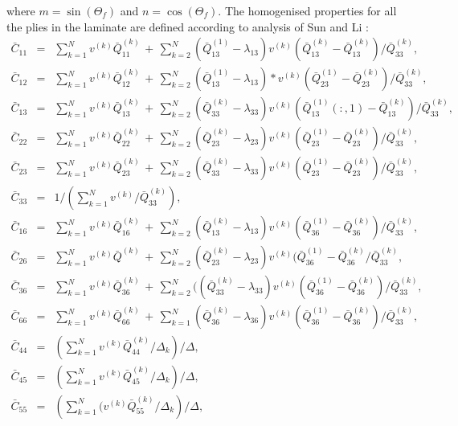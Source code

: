 where \(m=\sin(\Theta_f)\) and \(n=\cos(\Theta_f)\).
The homogenised properties for all the plies in the laminate are defined according to analysis of Sun and Li \cite{sun1988three}:
\begin{eqnarray}
	\bar{C}_{11} &=& \sum_{k=1}^Nv^{(k)}\bar{Q}^{(k)}_{11}\,+\,\sum_{k=2}^N(\bar{Q}^{(1)}_{13}-\lambda_{13})v^{(k)}(\bar{Q}^{(k)}_{13}-\bar{Q}^{(k)}_{13})/\bar{Q}^{(k)}_{33},\nonumber\\
	\bar{C}_{12} &=& \sum_{k=1}^Nv^{(k)}\bar{Q}^{(k)}_{12}\,+\,\sum_{k=2}^N(\bar{Q}^{(1)}_{13}-\lambda_{13})*v^{(k)}(\bar{Q}^{(1)}_{23}-\bar{Q}^{(k)}_{23})/\bar{Q}^{(k)}_{33},\nonumber\\
	\bar{C}_{13} &=& \sum_{k=1}^Nv^{(k)}\bar{Q}^{(k)}_{13}\,+\,\sum_{k=2}^N(\bar{Q}^{(k)}_{33}-\lambda_{33})v^{(k)}(\bar{Q}^{(1)}_{13}(:,1)-\bar{Q}^{(k)}_{13})/\bar{Q}^{(k)}_{33},\nonumber\\
	\bar{C}_{22} &=& \sum_{k=1}^Nv^{(k)}\bar{Q}^{(k)}_{22}\,+\,\sum_{k=2}^N(\bar{Q}^{(k)}_{23}-\lambda_{23})v^{(k)}(\bar{Q}^{(1)}_{23}-\bar{Q}^{(k)}_{23})/\bar{Q}^{(k)}_{33},\nonumber\\
	\bar{C}_{23} &=& \sum_{k=1}^Nv^{(k)}\bar{Q}^{(k)}_{23}\,+\,\sum_{k=2}^N(\bar{Q}^{(k)}_{33}-\lambda_{33})v^{(k)}(\bar{Q}^{(1)}_{23}-\bar{Q}^{(k)}_{23})/\bar{Q}^{(k)}_{33},\nonumber\\
	\bar{C}_{33} &=& 1/\left(\sum_{k=1}^Nv^{(k)}/\bar{Q}^{(k)}_{33}\right),\nonumber\\
	\bar{C}_{16} &=& \sum_{k=1}^Nv^{(k)}\bar{Q}^{(k)}_{16}\,+\,\sum_{k=2}^N(\bar{Q}^{(k)}_{13}-\lambda_{13})v^{(k)}(\bar{Q}^{(1)}_{36}-\bar{Q}^{(k)}_{36})/\bar{Q}^{(k)}_{33},\nonumber\\
	\bar{C}_{26} &=& \sum_{k=1}^Nv^{(k)}\bar{Q}^{(k)}\,+\,\sum_{k=2}^N(\bar{Q}^{(k)}_{23}-\lambda_{23})v^{(k)}(\bar{Q}^{(1)}_{36}-\bar{Q}^{(k)}_{36}/\bar{Q}^{(k)}_{33},\nonumber\\
	\bar{C}_{36} &=& \sum_{k=1}^Nv^{(k)}\bar{Q}^{(k)}_{36}\,+\,\sum_{k=2}^N((\bar{Q}^{(k)}_{33}-\lambda_{33})v^{(k)}(\bar{Q}^{(1)}_{36}-\bar{Q}^{(k)}_{36})/\bar{Q}^{(k)}_{33},\nonumber\\
	\bar{C}_{66} &=& \sum_{k=1}^Nv^{(k)}\bar{Q}^{(k)}_{66}\,+\,\sum_{k=1}^N(\bar{Q}^{(k)}_{36}-\lambda_{36})v^{(k)}(\bar{Q}^{(1)}_{36}-\bar{Q}^{(k)}_{36})/\bar{Q}^{(k)}_{33},\nonumber\\
	\bar{C}_{44} &=& \left(\sum_{k=1}^Nv^{(k)}\bar{Q}^{(k)}_{44}/\Delta_k\right)/\Delta,\nonumber\\
	\bar{C}_{45} &=& \left(\sum_{k=1}^Nv^{(k)}\bar{Q}^{(k)}_{45}/\Delta_k\right)/\Delta,\nonumber\\
	\bar{C}_{55} &=& \left(\sum_{k=1}^N(v^{(k)}\bar{Q}^{(k)}_{55}/\Delta_k\right)/\Delta,\nonumber
\end{eqnarray}
